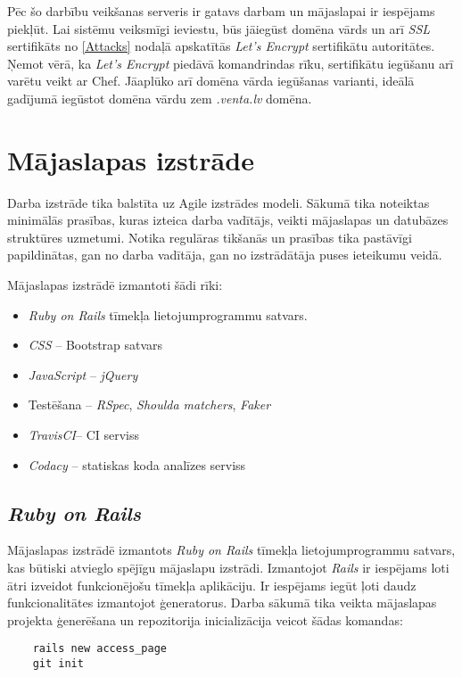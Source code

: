 Pēc šo darbību veikšanas serveris ir gatavs darbam un mājaslapai ir iespējams piekļūt. Lai sistēmu veiksmīgi ieviestu, būs jāiegūst domēna vārds un arī \textit{SSL} sertifikāts no \ref{Attacks} nodaļā apskatītās \textit{Let's Encrypt} sertifikātu autoritātes. Ņemot vērā, ka \textit{Let's Encrypt} piedāvā komandrindas rīku, sertifikātu iegūšanu arī varētu veikt ar Chef. Jāaplūko arī domēna vārda iegūšanas varianti, ideālā gadījumā iegūstot domēna vārdu zem \textit{.venta.lv} domēna.

\section{Mājaslapas izstrāde}
Darba izstrāde tika balstīta uz Agile izstrādes modeli. Sākumā tika noteiktas minimālās prasības, kuras izteica darba vadītājs, veikti mājaslapas un datubāzes struktūres uzmetumi. Notika regulāras tikšanās un prasības tika pastāvīgi papildinātas, gan no darba vadītāja, gan no izstrādātāja puses ieteikumu veidā.

Mājaslapas izstrādē izmantoti šādi rīki:
\begin{itemize}
	\item \textit{Ruby on Rails} tīmekļa lietojumprogrammu satvars.
	\item \textit{CSS} -- Bootstrap satvars
	\item \textit{JavaScript} -- \textit{jQuery}
	\item Testēšana -- \textit{RSpec}, \textit{Shoulda matchers}, \textit{Faker}
	\item \textit{TravisCI}-- CI serviss
	\item \textit{Codacy} -- statiskas koda analīzes serviss
\end{itemize}

\subsection{\textit{Ruby on Rails}}
Mājaslapas izstrādē izmantots \textit{Ruby on Rails} tīmekļa lietojumprogrammu satvars, kas būtiski atvieglo spējīgu mājaslapu izstrādi.
Izmantojot \textit{Rails} ir iespējams loti ātri izveidot funkcionējošu tīmekļa aplikāciju. Ir iespējams iegūt ļoti daudz funkcionalitātes izmantojot ģeneratorus.
Darba sākumā tika veikta mājaslapas projekta ģenerēšana un repozitorija inicializācija veicot šādas komandas:
\begin{lstlisting}
	rails new access_page
	git init
\end{lstlisting}

